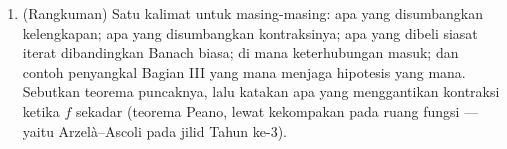 \begin{problem}
\begin{enumerate}[resume]
        pada ruas $\intcc{A}{B}$, sesuaikan pertanyaan 8 untuk menunjukkan
        bahwa batas faktorialnya berlaku pada \emph{seluruh} ruas itu,
        sehingga keberadaan dan ketunggalannya bersifat global di sana ---
        yakni kasus skalar teorema Cauchy--Lipschitz pada
        \cref{ch:b2:diffeq}, tanpa pembatasan pada panjang $B - A$.
  \item (Rangkuman) Satu kalimat untuk masing-masing: apa yang
        disumbangkan kelengkapan; apa yang disumbangkan kontraksinya; apa
        yang dibeli siasat iterat dibandingkan Banach biasa; di mana
        keterhubungan masuk; dan contoh penyangkal Bagian
        III yang mana menjaga hipotesis yang mana. Sebutkan teorema
        puncaknya, lalu katakan apa yang menggantikan kontraksi ketika $f$
        sekadar  (teorema Peano, lewat kekompakan pada ruang
        fungsi --- yaitu Arzelà--Ascoli pada jilid Tahun ke-3).

\end{enumerate}
\end{problem}

